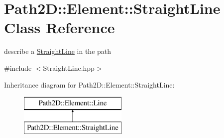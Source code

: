 \hypertarget{class_path2_d_1_1_element_1_1_straight_line}{}\section{Path2D\+:\+:Element\+:\+:Straight\+Line Class Reference}
\label{class_path2_d_1_1_element_1_1_straight_line}


describe a \mbox{\hyperlink{class_path2_d_1_1_element_1_1_straight_line}{Straight\+Line}} in the path  




{\ttfamily \#include $<$Straight\+Line.\+hpp$>$}

Inheritance diagram for Path2D\+:\+:Element\+:\+:Straight\+Line\+:\begin{figure}[H]
\begin{center}
\leavevmode
\includegraphics[height=2.000000cm]{class_path2_d_1_1_element_1_1_straight_line}
\end{center}
\end{figure}
